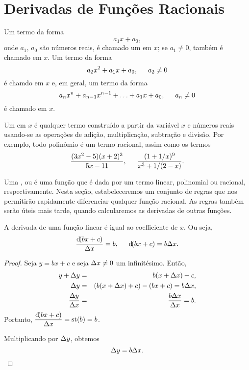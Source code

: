 \section{Derivadas de Funções Racionais}
\label{sec:derivratfunc}

Um termo da forma
$$
  a_1 x + a_0,
$$
onde $a_1$, $a_0$ são números reais, é chamado um  em $x$; se $a_1 \ne 0$, também é chamado  em $x$. Um termo da forma
$$
  a_2 x^2 + a_1 x + a_0, \hspace{1.5em} a_2 \ne 0
$$
é chamdo  em $x$ e,
em geral, um termo da forma
$$
  a_n x^n + a_{n-1} x^{n-1} + \ldots + a_1 x + a_0, \hspace{1.5em} a_n \ne 0
$$
é chamado  em $x$.

Um  em $x$ é qualquer termo
construído a partir da variável $x$ e números reais usando-se as
operações de adição, multiplicação, subtração e divisão. Por exemplo,
todo polinômio é um termo racional, assim como os termos
$$
  \frac{(3x^2- 5)(x+2)^3}{5x - 11}, \hspace{1.5em} \frac{(1+1/x)^9}{x^3 + 1/(2-x)}.
$$

Uma ,
 ou
 é uma função que é dada por
um termo linear, polinomial ou racional, respectivamente. Nesta seção,
estabeleceremos um conjunto de regras que nos permitirão rapidamente
diferenciar qualquer função racional. As regras também serão úteis mais
tarde, quando calcularemos as derivadas de outras funções.

\begin{theorem}\label{teo:difflinear}
A derivada de uma função linear é igual ao coefficiente de $x$. Ou seja,
$$
  \frac{\dif(bx + c)}{\dx} = b, \hspace{1.5em} \dif(bx + c) = b \dx.
$$
\end{theorem}

\begin{proof}
Seja $y = bx + c$ e seja $\Delta x \ne 0$ um infinitésimo. Então,
\begin{eqnarray*}
  y + \Delta y & = & b(x + \Delta x) + c, \\
      \Delta y & = & (b(x + \Delta x) + c) - (bx + c) = b \Delta x, \\
 \frac{\Delta y}{\Delta x} & = & \frac{b \Delta x}{\Delta x} = b.
\end{eqnarray*}
Portanto, $\displaystyle\frac{\dif(bx + c)}{\dx} = \std(b) = b$.

Multiplicando por $\Delta{y}$, obtemos
$$
  \Delta{y} = b \Delta{x}.
$$
\end{proof}

